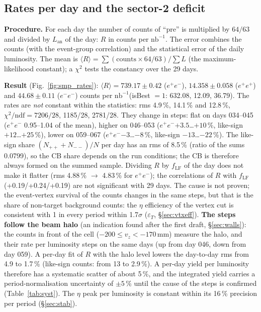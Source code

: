 \documentclass[11pt,a4paper]{article}
\newcommand{\ee}{\ensuremath{e^{+}e^{-}}\xspace}
\newcommand{\nbinv}{\ensuremath{\mathrm{nb}^{-1}}\xspace}
\newcommand{\Lan}{\ensuremath{L_{\mathrm{an}}}\xspace}
\newcommand{\vz}{\ensuremath{v_z}\xspace}
\begin{document}
\subsection{Rates per day and the sector-2 deficit}
\label{sec:rates}
\textbf{Procedure.} For each day the number of counts of ``pre'' is multiplied by $64/63$ and divided by \Lan
of the day: $R$ in counts per \nbinv. The error combines the counts (with the event-group correlation) and the
statistical error of the daily luminosity. The mean is $\langle R\rangle=\sum(\text{counts}\times64/63)/\sum L$
(the maximum-likelihood constant); a $\chi^2$ tests the constancy over the 29 days.

\textbf{Result} (Fig.~\ref{fig:smp_rates}): $\langle R\rangle=739.17\pm0.42$ (\ee),
$14.358\pm0.058$ ($e^+e^+$) and $44.68\pm0.11$ ($e^-e^-$) counts per \nbinv (isBest $=1$: 632.08, 12.09,
36.79). The rates are \emph{not} constant within the statistics: rms 4.9\,\%, 14.1\,\% and 12.8\,\%,
$\chi^2/\mathrm{ndf}=7206/28$, 1185/28, 2781/28. They change in steps: flat on days 034--045 (\ee
0.95--1.04 of the mean), higher on 046--053 (\ee $+3.5$\dots$+10$\,\%, like-sign $+12$\dots$+25$\,\%), lower
on 059--067 (\ee $-3$\dots$-8$\,\%, like-sign $-13$\dots$-22$\,\%). The like-sign share
$(N_{++}+N_{--})/N$ per day has an rms of 8.5\,\% (ratio of the sums 0.0799), so the CB share depends on the
run conditions; the CB is therefore always formed on the summed sample. Dividing $R$ by $f_{\mathrm{LF}}$ of
the day does not make it flatter (rms 4.88\,\% $\to$ 4.83\,\% for \ee); the correlations of $R$ with
$f_{\mathrm{LF}}$ (+0.19/+0.24/+0.19) are not significant with 29 days. The cause is not proven; the event-vertex survival of the counts
changes in the same steps, but that is the share of non-target background counts: the $\eta$ efficiency of the vertex cut is consistent with
1 in every period within 1.7$\sigma$ ($\varepsilon_T$, \S\ref{sec:vtxeff}). \textbf{The steps follow the beam halo} (an indication found
after the first draft, \S\ref{sec:walls}): the counts in front of the cell ($-200\le\vz<-170$\,mm) measure the halo, and their rate per
luminosity steps on the same days (up from day 046, down from day 059). A per-day fit of $R$ with the halo level lowers the day-to-day rms from
4.9 to 1.7\,\% (like-sign counts: from 13 to 2.9\,\%). A per-day yield per luminosity therefore has a
systematic scatter of about 5\,\%, and the integrated yield carries a period-normalisation uncertainty of $\pm5$\,\% until the cause of the
steps is confirmed (Table~\ref{tab:syst}). The $\eta$ peak per luminosity is constant within
its 16\,\% precision per period (\S\ref{sec:stab}).
\end{document}
